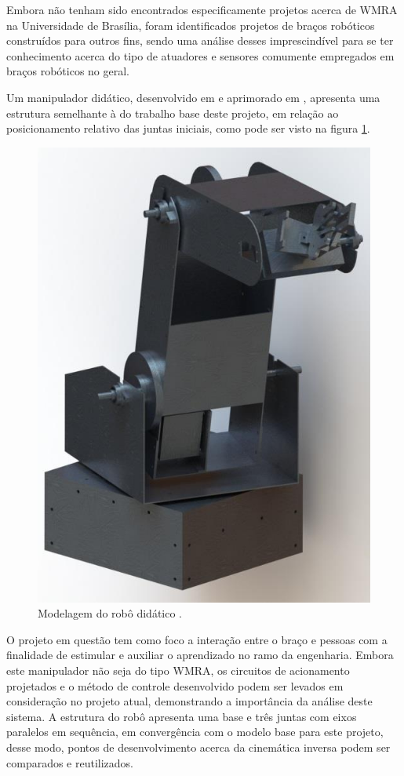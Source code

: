 Embora não tenham sido encontrados especificamente projetos acerca de WMRA na Universidade de Brasília, foram identificados projetos de braços robóticos
construídos para outros fins, sendo uma análise desses imprescindível para se ter conhecimento acerca do tipo de atuadores e sensores comumente empregados em 
braços robóticos no geral.

Um manipulador didático, desenvolvido em \cite{wattylas2015didatico} e aprimorado em \cite{marconi2016didatico}, apresenta uma estrutura semelhante à do trabalho base
deste projeto, em relação ao posicionamento relativo das juntas iniciais, como pode ser visto na figura \ref{fig:manipulador-didatico}.

\begin{figure}[ht]
\caption{Modelagem do robô didático \cite{wattylas2015didatico}.}    
\begin{centering}
\includegraphics[width=0.5\columnwidth]{images/fundamentos/manipulador-didatico.png}
\par\end{centering}

\label{fig:manipulador-didatico}
\end{figure}

O projeto em questão tem como foco a interação entre o braço e pessoas com a finalidade de estimular e auxiliar o aprendizado no ramo da engenharia.
Embora este manipulador não seja do tipo WMRA, os circuitos de 
acionamento projetados e o método de controle desenvolvido podem ser 
levados em consideração no projeto atual, demonstrando a importância da
análise deste sistema.
A estrutura do robô apresenta uma base e três juntas com eixos paralelos
em sequência, em convergência com o modelo base para este projeto, desse modo,
pontos de desenvolvimento acerca da cinemática inversa podem ser comparados
e reutilizados.

